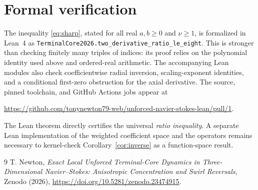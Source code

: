 \documentclass[11pt]{article}
\begin{document}
\section{Formal verification}
The inequality \eqref{eq:sharp}, stated for all real
$a,b\geq0$ and $\nu\geq1$, is formalized in Lean~4 as
\texttt{TerminalCore2026.two\_derivative\_ratio\_le\_eight}.
This is stronger than checking finitely many triples of indices:
its proof relies on the polynomial identity used above and
ordered-real arithmetic.  The accompanying Lean modules also
check coefficientwise radial inversion, scaling-exponent identities,
and a conditional first-zero obstruction for the axial derivative.
The source, pinned toolchain, and GitHub Actions jobs appear at
\begin{center}
\small
\url{https://github.com/tonynewton79-web/unforced-navier-stokes-lean/pull/1}.
\end{center}
The Lean theorem directly certifies the universal
\emph{ratio inequality}.  A separate Lean implementation of the
weighted coefficient space and the operators remains necessary
to kernel-check Corollary~\ref{cor:inverse} as a function-space result.

\begin{thebibliography}{9}
T. Newton,
\emph{Exact Local Unforced Terminal-Core Dynamics in
Three-Dimensional Navier--Stokes: Anisotropic Concentration and Swirl
Reversals}, Zenodo (2026),
\url{https://doi.org/10.5281/zenodo.23474915}.
\end{thebibliography}
\end{document}

